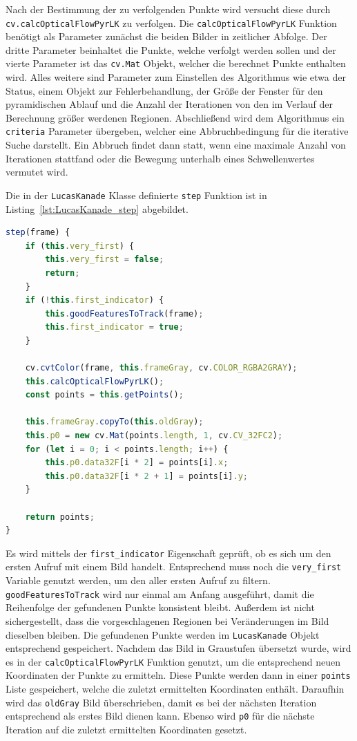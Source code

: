 Nach der Bestimmung der zu verfolgenden Punkte wird versucht diese durch \lstinline{cv.calcOpticalFlowPyrLK} zu verfolgen.
Die \lstinline{calcOpticalFlowPyrLK} Funktion benötigt als Parameter zunächst die beiden Bilder in zeitlicher Abfolge.
Der dritte Parameter beinhaltet die Punkte, welche verfolgt werden sollen und der vierte Parameter ist das \lstinline{cv.Mat} Objekt, welcher die berechnet Punkte enthalten wird.
Alles weitere sind Parameter zum Einstellen des Algorithmus wie etwa der Status, einem Objekt zur Fehlerbehandlung, der Grö{\ss}e der Fenster für den pyramidischen Ablauf und die Anzahl der Iterationen von den im Verlauf der Berechnung grö{\ss}er werdenen Regionen.
Abschlie{\ss}end wird dem Algorithmus ein \lstinline{criteria} Parameter übergeben, welcher eine Abbruchbedingung für die iterative Suche darstellt.
Ein Abbruch findet dann statt, wenn eine maximale Anzahl von Iterationen stattfand oder die Bewegung unterhalb eines Schwellenwertes vermutet wird.

Die in der \lstinline{LucasKanade} Klasse definierte \lstinline{step} Funktion ist in Listing~\ref{lst:LucasKanade_step} abgebildet.

\begin{lstlisting}[language=JavaScript, caption={Implementation der \lstinline{step} Funktion der \lstinline{LucasKanade} Klasse}, label={lst:LucasKanade_step}]
step(frame) {
    if (this.very_first) {
        this.very_first = false;
        return;
    }
    if (!this.first_indicator) {
        this.goodFeaturesToTrack(frame);
        this.first_indicator = true;
    }

    cv.cvtColor(frame, this.frameGray, cv.COLOR_RGBA2GRAY);
    this.calcOpticalFlowPyrLK();
    const points = this.getPoints();

    this.frameGray.copyTo(this.oldGray);
    this.p0 = new cv.Mat(points.length, 1, cv.CV_32FC2);
    for (let i = 0; i < points.length; i++) {
        this.p0.data32F[i * 2] = points[i].x;
        this.p0.data32F[i * 2 + 1] = points[i].y;
    }

    return points;
}
\end{lstlisting}

Es wird mittels der \lstinline{first_indicator} Eigenschaft geprüft, ob es sich um den ersten Aufruf mit einem Bild handelt.
Entsprechend muss noch die \lstinline{very_first} Variable genutzt werden, um den aller ersten Aufruf zu filtern.
\lstinline{goodFeaturesToTrack} wird nur einmal am Anfang ausgeführt, damit die Reihenfolge der gefundenen Punkte konsistent bleibt.
Au{\ss}erdem ist nicht sichergestellt, dass die vorgeschlagenen Regionen bei Veränderungen im Bild dieselben bleiben.
Die gefundenen Punkte werden im \lstinline{LucasKanade} Objekt entsprechend gespeichert.
Nachdem das Bild in Graustufen übersetzt wurde, wird es in der \lstinline{calcOpticalFlowPyrLK} Funktion genutzt, um die entsprechend neuen Koordinaten der Punkte zu ermitteln.
Diese Punkte werden dann in einer \lstinline{points} Liste gespeichert, welche die zuletzt ermittelten Koordinaten enthält.
Daraufhin wird das \lstinline{oldGray} Bild überschrieben, damit es bei der nächsten Iteration entsprechend als erstes Bild dienen kann.
Ebenso wird \lstinline{p0} für die nächste Iteration auf die zuletzt ermittelten Koordinaten gesetzt.

